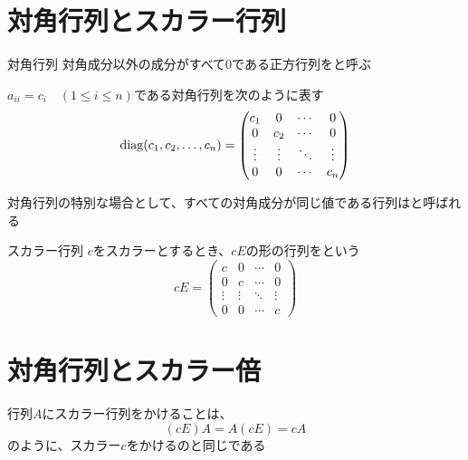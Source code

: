 \documentclass[../../../topic_linear-algebra]{subfiles}
\begin{document}
\sectionline
\section{対角行列とスカラー行列}

\begin{definition*}{対角行列}
  対角成分以外の成分がすべて0である正方行列をと呼ぶ

  $a_{ii} = c_i \quad (1 \leq i \leq n)$である対角行列を次のように表す
  \begin{equation*}
    \operatorname{diag}(c_1, c_2, \ldots, c_n) = \begin{pmatrix}
      c_1    & 0      & \cdots & 0      \\
      0      & c_2    & \cdots & 0      \\
      \vdots & \vdots & \ddots & \vdots \\
      0      & 0      & \cdots & c_n
    \end{pmatrix}
  \end{equation*}
\end{definition*}

\br

対角行列の特別な場合として、すべての対角成分が同じ値である行列はと呼ばれる

\begin{definition*}{スカラー行列}
  $c$をスカラーとするとき、$cE$の形の行列をという
  \begin{equation*}
    cE = \begin{pmatrix}
      c      & 0      & \cdots & 0      \\
      0      & c      & \cdots & 0      \\
      \vdots & \vdots & \ddots & \vdots \\
      0      & 0      & \cdots & c
    \end{pmatrix}
  \end{equation*}
\end{definition*}

\sectionline
\section{対角行列とスカラー倍}

行列$A$にスカラー行列をかけることは、
\begin{equation*}
  (cE)A = A(cE) = cA
\end{equation*}
のように、スカラー$c$をかけるのと同じである
\end{document}
